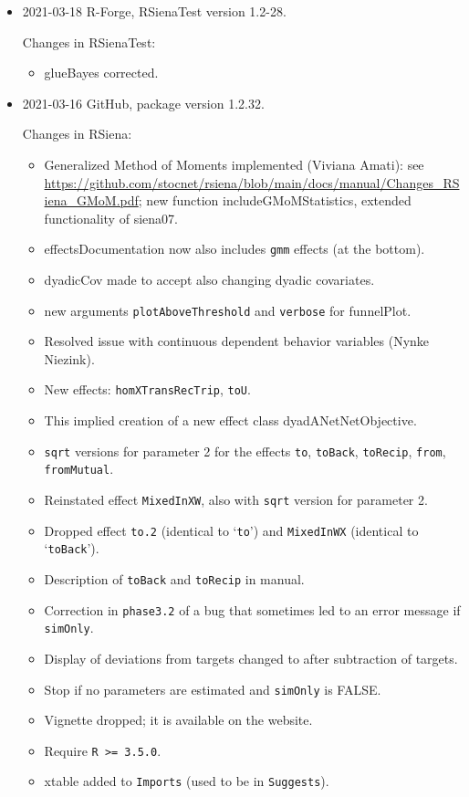 \documentclass[a4paper,fleqn,11pt]{article}
\newcommand{\+}{\, + \,}
\newcommand{\sfn}[1]{\textsf{#1}}
\begin{document}
\begin{small}
\begin{itemize}
\item 2021-03-18  R-Forge, \sfn{RSienaTest} version 1.2-28.

Changes in \textsf{RSienaTest}:
\begin{itemize}
\item \sfn{glueBayes} corrected.
\end{itemize}

\item 2021-03-16  GitHub, package version 1.2.32.

Changes in RSiena:
\begin{itemize}
   \item Generalized Method of Moments implemented (Viviana Amati):
     see\\
     \url{https://github.com/stocnet/rsiena/blob/main/docs/manual/Changes_RSiena_GMoM.pdf};
     new function \sfn{includeGMoMStatistics}, extended functionality of \textsf{siena07}.
   \item \sfn{effectsDocumentation} now also includes \texttt{gmm} effects (at the bottom).
   \item \sfn{dyadicCov} made to accept also changing dyadic covariates.
   \item new arguments \texttt{plotAboveThreshold} and \texttt{verbose} for \sfn{funnelPlot}.
   \item Resolved issue with continuous dependent behavior variables
     (Nynke Niezink).
   \item New effects: \texttt{homXTransRecTrip}, \texttt{toU}.
   \item This implied creation of a new effect class \sfn{dyadANetNetObjective}.
   \item \texttt{sqrt} versions for parameter 2 for the effects
      \texttt{to}, \texttt{toBack}, \texttt{toRecip},
     \texttt{from}, \texttt{fromMutual}.
   \item Reinstated effect \texttt{MixedInXW}, also with \texttt{sqrt} version for parameter 2.
   \item Dropped effect \texttt{to.2} (identical to `\texttt{to}')
     and \texttt{MixedInWX} (identical to `\texttt{toBack}').
   \item Description of \texttt{toBack} and \texttt{toRecip} in manual.
   \item Correction in \texttt{phase3.2} of a bug that sometimes led to an error message
     if \texttt{simOnly}.
   \item Display of deviations from targets changed to after subtraction of targets.
   \item Stop if no parameters are estimated and \texttt{simOnly} is FALSE.
   \item Vignette dropped; it is available on the website.
   \item Require \texttt{R >= 3.5.0}.
   \item \sfn{xtable} added to \texttt{Imports} (used to be in \texttt{Suggests}).
\end{itemize}



\end{itemize}
\end{small}
\end{document}
